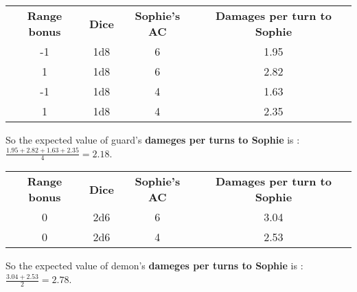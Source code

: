 \begin{table}[H]
  \centering
  \begin{tabular}{|c|c|c|c|}
    \hline
    \rowcolor[HTML]{9B9B9B}
    \multicolumn{4}{|c|}{\cellcolor[HTML]{9B9B9B}{\color[HTML]{FFFFFF} \textbf{Guard}}} \\ \hline
    \rowcolor[HTML]{C0C0C0}
    \textbf{Range bonus} & \textbf{Dice} & \textbf{Sophie's AC} & \textbf{Damages per turn to Sophie} \\ \hline
    -1 & 1d8 & 6 & 1.95 \\ \hline
     1 & 1d8 & 6 & 2.82 \\ \hline
    -1 & 1d8 & 4 & 1.63\\ \hline
     1 & 1d8 & 4 & 2.35 \\ \hline
  \end{tabular}
\end{table}
So the expected value of guard's \textbf{dameges per turns to Sophie} is :\\
$\frac{1.95+2.82+1.63+2.35}{4}=2.18$.\\

\begin{table}[H]
  \centering
  \begin{tabular}{|c|c|c|c|}
    \hline
    \rowcolor[HTML]{9B9B9B}
    \multicolumn{4}{|c|}{\cellcolor[HTML]{9B9B9B}{\color[HTML]{FFFFFF} \textbf{Demon}}} \\ \hline
    \rowcolor[HTML]{C0C0C0}
    \textbf{Range bonus} & \textbf{Dice} & \textbf{Sophie's AC} & \textbf{Damages per turn to Sophie} \\ \hline
    0 & 2d6 & 6 & 3.04 \\ \hline
    0 & 2d6 & 4 & 2.53 \\ \hline
  \end{tabular}
\end{table}
So the expected value of demon's \textbf{dameges per turns to Sophie} is :\\
$\frac{3.04+2.53}{2}=2.78$.\\

